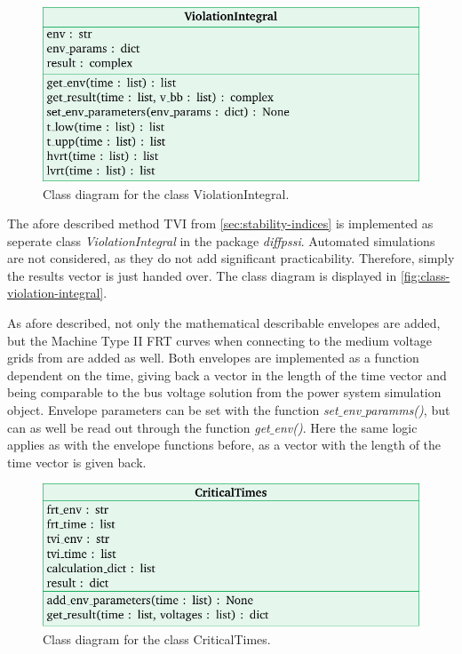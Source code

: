 \begin{figure}[htbp!]
        \centering
        \includegraphics{tikz_graphics/images/class_diagram_violationintegral.pdf}
        \caption[Class diagram for the class ViolationIntegral]{Class diagram for the class ViolationIntegral.}
        \label{fig:class-violation-integral}
\end{figure}

The afore described method \acs{TVI} from \autoref{sec:stability-indices} is implemented as seperate class \textit{ViolationIntegral} in the package \textit{diffpssi}.
Automated simulations are not considered, as they do not add significant practicability.
Therefore, simply the results vector is just handed over.
The class diagram is displayed in \autoref{fig:class-violation-integral}.

As afore described, not only the mathematical describable envelopes are added, but the Machine Type II \acs{FRT} curves when connecting to the medium voltage grids from \autocite{vde-tar_2018,vde-tar_2023} are added as well.
Both envelopes are implemented as a function dependent on the time, giving back a vector in the length of the time vector and being comparable to the bus voltage solution from the power system simulation object.
Envelope parameters can be set with the function \textit{set$\_$env$\_$paramms()}, but can as well be read out through the function \textit{get$\_$env()}.
Here the same logic applies as with the envelope functions before, as a vector with the length of the time vector is given back.

\begin{figure}[htbp!]
        \centering
        \includegraphics{tikz_graphics/images/class_diagram_criticaltimes.pdf}
        \caption[Class diagram for the class CriticalTimes]{Class diagram for the class CriticalTimes.}
        \label{fig:class-critical-times}
\end{figure}

